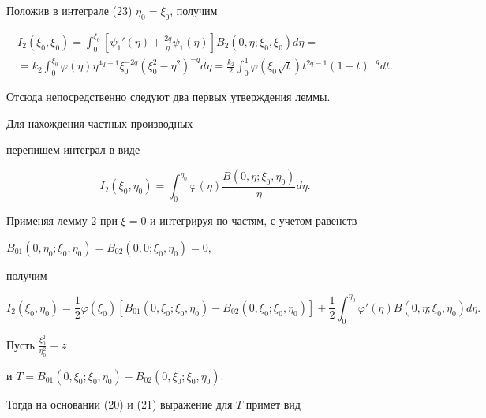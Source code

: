 \begin{pf}


Положив в интеграле (23) $\eta_0=\xi_0$, получим


\begin{multline*}


I_2(\xi_0,\xi_0)=\int_0^{\xi_0} \left[ \psi_1 '(\eta)+\frac{2q}{\eta}


\psi_1 (\eta)\right] B_2(0,\eta;\xi_0,\xi_0) d\eta=\\


=k_2\int_0^{\xi_0} \varphi(\eta)


\eta^{4q-1} \xi_0^{-2q} (\xi_0^2-\eta^2)^{-q}d\eta=


\frac{k_2}{2} \int_0^1 \varphi (\xi_0\sqrt t) t^{2q-1} (1-t)^{-q} dt.


\end{multline*}


Отсюда непосредственно следуют два первых утверждения леммы.





Для нахождения частных производных


перепишем интеграл в виде


$$


I_2(\xi_0,\eta_0)=\int_0^{\eta_0} \varphi(\eta)\frac{B(0,\eta;\xi_0,\eta_0)}


{\eta} d\eta.


$$


Применяя лемму 2 при $\xi=0$ и интегрируя по частям, с учетом равенств    


$B_{01}(0,\eta_0;\xi_0,\eta_0)= B_{02}(0,0;\xi_0,\eta_0)=0$,


получим


\begin{equation}


I_2(\xi_0,\eta_0)=\frac{1}{2}\varphi(\xi_0)[


B_{01}(0,\xi_0;\xi_0,\eta_0)-B_{02}(0,\xi_0;\xi_0,\eta_0)]+


\frac{1}{2}\int_0^{\eta_0} \varphi'(\eta)B(0,\eta;\xi_0,\eta_0) d\eta.


\end{equation}





Пусть ${\frac{\xi_0^2}{\eta_0^2}}=z$ 


и $T=B_{01}(0,\xi_0;\xi_0,\eta_0)-B_{02}(0,\xi_0;\xi_0,\eta_0)$.


Тогда на основании (20) и (21) выражение для $T$ примет вид  



\end{pf}
